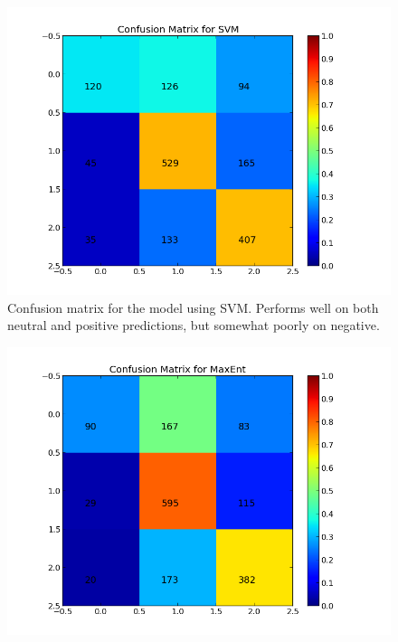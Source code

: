 \begin{minipage}[t!]{\linewidth}
     \centering
     \begin{minipage}{0.45\linewidth}
          \begin{figure}[H]
               \includegraphics[width=\linewidth]{../img/plots/grid/confusion_matrix_SVM.png}
           \caption[The confusion matrix for SVM]{Confusion matrix for the model using SVM. Performs well on both neutral and positive predictions, but somewhat poorly on negative.}
           \label{fig:confmat_svm}
          \end{figure}
     \end{minipage}
     \hspace{0.05\linewidth}
     \begin{minipage}{0.45\linewidth}
          \begin{figure}[H]
               \includegraphics[width=\linewidth]{../img/plots/grid/confusion_matrix_MaxEnt.png}

\end{figure}
\end{minipage}
\end{minipage}
